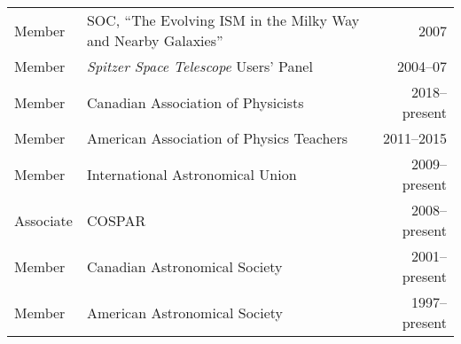 \begin{tabularx}{\textwidth}{lXr}
Member& SOC, ``The Evolving ISM in the Milky Way and Nearby Galaxies'' & 2007\\
Member& {\it Spitzer Space Telescope} Users' Panel& 2004--07\\
Member& Canadian Association of Physicists& 2018--present\\
Member& American Association of Physics Teachers& 2011--2015\\
Member& International Astronomical Union& 2009--present\\
Associate& COSPAR& 2008--present\\
Member& Canadian Astronomical Society& 2001--present\\
Member& American Astronomical Society& 1997--present
\end{tabularx}
